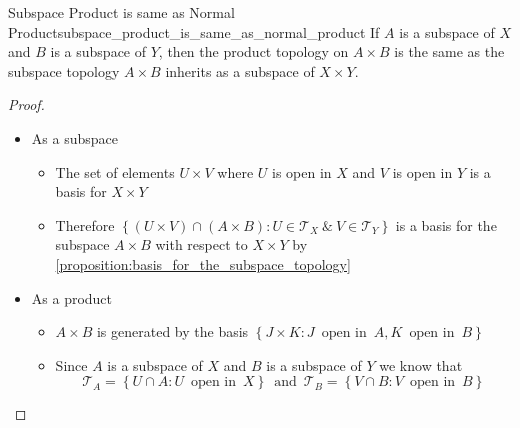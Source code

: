 \begin{proposition}{Subspace Product is same as Normal
Product}{subspace_product_is_same_as_normal_product}
If \( A \) is a subspace of \( X \) and \( B \) is a subspace of \( Y \), then
the product topology on \( A \times B \) is the same as the subspace topology \(
A \times B\) inherits as a subspace of \( X \times Y \).
\end{proposition}
\begin{proof}
\begin{itemize}
    \item As a subspace
    \begin{itemize}
        \item The set of elements \( U \times V \) where \( U \) is open in \( X
        \) and \( V \) is open in \( Y \)  is a basis for \( X \times Y
        \)
        \item Therefore \( \left\{ \left( U \times  V \right) \cap \left( A \times B
        \right): U \in \mathcal{ T } _{ X } ~\&~ V \in \mathcal{ T } _{ Y }
        \right\}  \) is a basis for the subspace \( A \times B \) with
        respect to \( X \times Y \) by
        \ref{proposition:basis_for_the_subspace_topology}
    \end{itemize}
    \item As a product
    \begin{itemize}
        \item \( A \times B \) is generated by the basis \( \left\{ J \times
        K: J \enspace \text{open in} \enspace A, K \enspace \text{open in}
        \enspace B \right\}  \) 
        \item Since \( A \) is a subspace of \( X \) and \( B \) is a subspace
        of \( Y \) we know that
        \[
        \mathcal{ T } _{ A } = \left\{ U \cap A: U \enspace \text{open in}
        \enspace X \right\}  \enspace \text{and} \enspace  
        \mathcal{ T } _{ B } = \left\{ V \cap B: V \enspace \text{open in}
        \enspace B \right\} 
        \]
    \end{itemize}


\end{itemize}
\end{proof}
